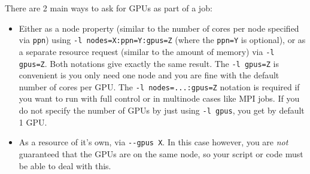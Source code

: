 There are 2 main ways to ask for GPUs as part of a job:

\begin{itemize}
  \item Either as a node property (similar to the number of cores
  per node specified via \lstinline|ppn|) using \lstinline|-l nodes=X:ppn=Y:gpus=Z| (where the \lstinline|ppn=Y| is optional),
  or as a separate resource request (similar to the amount of memory) via \lstinline|-l gpus=Z|.
  Both notations give exactly the same result.
  The \lstinline|-l gpus=Z| is convenient is you only need one
  node and you are fine with the default number of cores per GPU.
  The \lstinline|-l nodes=...:gpus=Z| notation is required if you want to run with full control or in multinode cases like MPI jobs.
  If you do not specify the number of GPUs by just using \lstinline|-l gpus|, you get by default 1 GPU.
\item As a resource of it's own, via \lstinline|--gpus X|.
  In this case however, you are \emph{not} guaranteed that the GPUs are on the same node,
  so your script or code must be able to deal with this.
\end{itemize}

